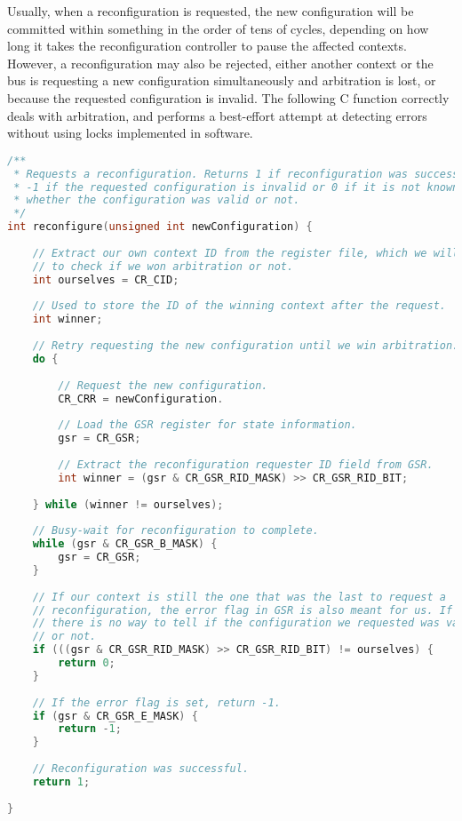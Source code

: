 \noindent Usually, when a reconfiguration is requested, the new configuration 
will be committed within something in the order of tens of cycles, depending on 
how long it takes the reconfiguration controller to pause the affected contexts. 
However, a reconfiguration may also be rejected, either another context or the 
bus is requesting a new configuration simultaneously and arbitration is lost, or 
because the requested configuration is invalid. The following C function
correctly deals with arbitration, and performs a best-effort attempt at
detecting errors without using locks implemented in software.

\begin{lstlisting}[numbers=none, basicstyle=\footnotesize, language=C]
/**
 * Requests a reconfiguration. Returns 1 if reconfiguration was successful,
 * -1 if the requested configuration is invalid or 0 if it is not known
 * whether the configuration was valid or not.
 */
int reconfigure(unsigned int newConfiguration) {
    
    // Extract our own context ID from the register file, which we will use
    // to check if we won arbitration or not.
    int ourselves = CR_CID;
    
    // Used to store the ID of the winning context after the request.
    int winner;
    
    // Retry requesting the new configuration until we win arbitration.
    do {
        
        // Request the new configuration.
        CR_CRR = newConfiguration.
        
        // Load the GSR register for state information.
        gsr = CR_GSR;
        
        // Extract the reconfiguration requester ID field from GSR.
        int winner = (gsr & CR_GSR_RID_MASK) >> CR_GSR_RID_BIT;
        
    } while (winner != ourselves);
    
    // Busy-wait for reconfiguration to complete.
    while (gsr & CR_GSR_B_MASK) {
        gsr = CR_GSR;
    }
    
    // If our context is still the one that was the last to request a
    // reconfiguration, the error flag in GSR is also meant for us. If not,
    // there is no way to tell if the configuration we requested was valid
    // or not.
    if (((gsr & CR_GSR_RID_MASK) >> CR_GSR_RID_BIT) != ourselves) {
        return 0;
    }
    
    // If the error flag is set, return -1.
    if (gsr & CR_GSR_E_MASK) {
        return -1;
    }
    
    // Reconfiguration was successful.
    return 1;
    
}
\end{lstlisting}

